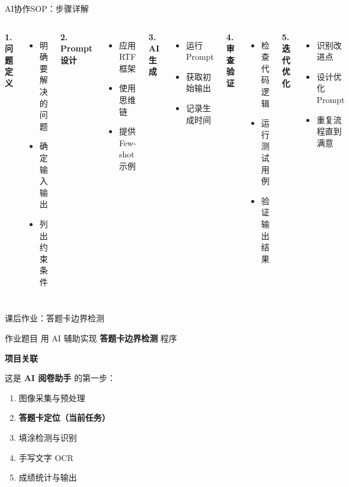 \begin{frame}{AI协作SOP：步骤详解}
	\begin{columns}
		\textbf{1. 问题定义}
		\begin{itemize}
			\item 明确要解决的问题
			\item 确定输入输出
			\item 列出约束条件
		\end{itemize}

		\textbf{2. Prompt 设计}
		\begin{itemize}
			\item 应用 RTF 框架
			\item 使用思维链
			\item 提供 Few-shot 示例
		\end{itemize}

		\textbf{3. AI 生成}
		\begin{itemize}
			\item 运行 Prompt
			\item 获取初始输出
			\item 记录生成时间
		\end{itemize}

		\textbf{4. 审查验证}
		\begin{itemize}
			\item 检查代码逻辑
			\item 运行测试用例
			\item 验证输出结果
		\end{itemize}

		\textbf{5. 迭代优化}
		\begin{itemize}
			\item 识别改进点
			\item 设计优化 Prompt
			\item 重复流程直到满意
		\end{itemize}
	\end{columns}
\end{frame}


\begin{frame}{课后作业：答题卡边界检测}
	\begin{block}{作业题目}
		用 AI 辅助实现 \textbf{答题卡边界检测} 程序
	\end{block}

	\vspace{0.3cm}

	\textbf{项目关联}

	这是 \textbf{AI 阅卷助手} 的第一步：
	\begin{enumerate}
		\item 图像采集与预处理
		\item \textbf{答题卡定位（当前任务）}
		\item 填涂检测与识别
		\item 手写文字 OCR
		\item 成绩统计与输出
	\end{enumerate}
\end{frame}

